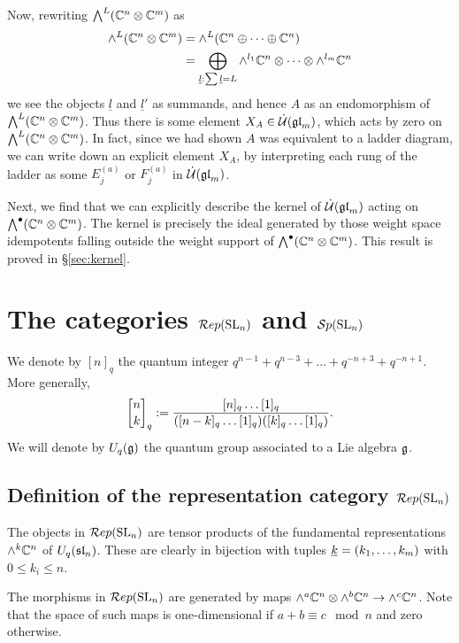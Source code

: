 \documentclass[10pt,leqno]{article}
\begin{document}
Now, rewriting $\Alt^L(\mathbb C^n \tensor \mathbb C^m)$ as
\begin{align*}
\alt^L(\mathbb C^n \tensor \mathbb C^m) & = \alt^L(\mathbb C^n \directSum \cdots \directSum \mathbb C^n) \\
        & = \DirectSum_{\underline{l}: \sum \underline{l} = L} \alt^{l_1} \mathbb C^n \tensor \cdots \tensor \alt^{l_m} \mathbb C^n
\end{align*}
we see the objects $\underline{l}$ and $\underline{l}'$ as summands, and hence $A$ as an endomorphism of $\Alt^L(\mathbb C^n \tensor \mathbb C^m)$. Thus there is some element $X_{A} \in \dU(\gl_m)$, which acts by zero on $\Alt^L(\mathbb C^n \tensor \mathbb C^m)$. In fact, since we had shown $A$ was equivalent to a ladder diagram, we can write down an explicit element $X_A$, by interpreting each rung of the ladder as some $E^{(a)}_j$ or $F^{(a)}_j$ in $\dU(\gl_m)$. 

Next, we find that we can explicitly describe the kernel of $\dU(\gl_m)$ acting on $\Alt^\bullet(\mathbb C^n \tensor \mathbb C^m)$. The kernel is precisely the ideal generated by those weight space idempotents falling outside the weight support of $\Alt^\bullet(\mathbb C^n \tensor \mathbb C^m)$.  This result is proved in \S \ref{sec:kernel}.


\section{The categories $\Rep(\SL_n)$ and $\Sp(\SL_n)$}\label{sec:diagrams}

We denote by $[n]_q$ the quantum integer $q^{n-1} + q^{n-3} + \dots + q^{-n+3} + q^{-n+1}$. More generally, 
$$\qBinomial{n}{k} := \frac{[n]_q\dots[1]_q}{([n-k]_q \dots [1]_q)([k]_q \dots [1]_q)}.$$
We will denote by $U_q(\g)$ the quantum group associated to a Lie algebra $\g$. 

\subsection{Definition of the representation category $\Rep(\SL_n)$}

The objects in $\Rep(\SL_n)$ are tensor products of the fundamental representations $\alt^k \bC^n$ of $U_q(\sl_n)$. These are clearly in bijection with tuples $\ul{k} = (k_1, \dots, k_m)$ with $0 \le k_i \le n$. 

The morphisms in $\Rep(\SL_n)$ are generated by maps $\alt^a \bC^n \otimes \alt^b \bC^n \rightarrow \alt^c \bC^n$. Note that the space of such maps is one-dimensional if $a+b \equiv c \mod n$ and zero otherwise. 
\end{document}
